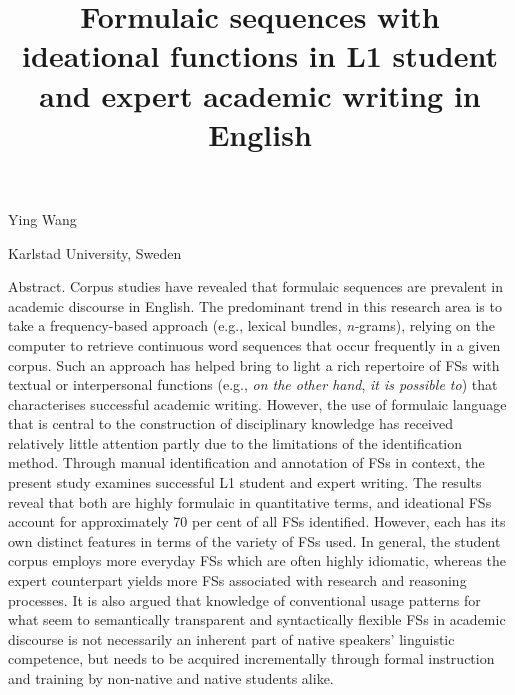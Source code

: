 
\title{Formulaic sequences with ideational functions in L1 student and expert academic writing in English}
\maketitle

\begin{styleStandard}
Ying Wang 
\end{styleStandard}

\begin{styleStandard}
Karlstad University, Sweden
\end{styleStandard}

\begin{styleStandard}
Abstract. Corpus studies have revealed that formulaic sequences are prevalent in academic discourse in English. The predominant trend in this research area is to take a frequency-based approach (e.g., lexical bundles, \textit{n-}grams), relying on the computer to retrieve continuous word sequences that occur frequently in a given corpus. Such an approach has helped bring to light a rich repertoire of FSs with textual or interpersonal functions (e.g., \textit{on the other hand}, \textit{it is possible to}) that characterises successful academic writing. However, the use of formulaic language that is central to the construction of disciplinary knowledge has received relatively little attention partly due to the limitations of the identification method. Through manual identification and annotation of FSs in context, the present study examines successful L1 student and expert writing. The results reveal that both are highly formulaic in quantitative terms, and ideational FSs account for approximately 70 per cent of all FSs identified. However, each has its own distinct features in terms of the variety of FSs used. In general, the student corpus employs more everyday FSs which are often highly idiomatic, whereas the expert counterpart yields more FSs associated with research and reasoning processes. It is also argued that knowledge of conventional usage patterns for what seem to semantically transparent and syntactically flexible FSs in academic discourse is not necessarily an inherent part of native speakers’ linguistic competence, but needs to be acquired incrementally through formal instruction and training by non-native and native students alike.
\end{styleStandard}


